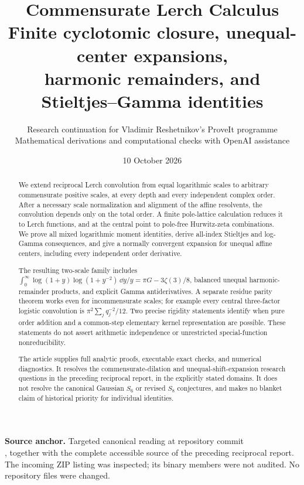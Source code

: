 \documentclass[11pt,a4paper]{article}
\title{\textbf{Commensurate Lerch Calculus}\\[6pt]
\large Finite cyclotomic closure, unequal-center expansions,\\
harmonic remainders, and Stieltjes--Gamma identities}
\author{Research continuation for Vladimir Reshetnikov's ProveIt programme\\
\small Mathematical derivations and computational checks with OpenAI assistance}
\date{10 October 2026}
\begin{document}
\maketitle
\begin{abstract}
We extend reciprocal Lerch convolution from equal logarithmic scales to
arbitrary commensurate positive scales, at every depth and every independent
complex order. After a necessary scale normalization and alignment of the
affine resolvents, the convolution depends only on the total order. A finite
pole-lattice calculation reduces it to Lerch functions, and at the central
point to pole-free Hurwitz-zeta combinations. We prove all mixed logarithmic
moment identities, derive all-index Stieltjes and log-Gamma consequences,
and give a normally convergent expansion for unequal affine centers,
including every independent order derivative.

The resulting two-scale family includes
$\int_0^\infty\log(1+y)\log(1+y^{-2})\,\dd y/y
=\pi G-3\zeta(3)/8$, balanced unequal harmonic-remainder products, and
explicit Gamma antiderivatives. A separate residue parity theorem works even
for incommensurate scales; for example every central three-factor logistic
convolution is $\pi^2\sum_jq_j^{-2}/12$. Two precise rigidity statements
identify when pure order addition and a common-step elementary kernel
representation are possible. These statements do not assert arithmetic
independence or unrestricted special-function nonreducibility.

The article supplies full analytic proofs, executable exact checks, and
numerical diagnostics. It resolves the commensurate-dilation and
unequal-shift-expansion research questions in the preceding reciprocal
report, in the explicitly stated domains. It does not resolve the canonical
Gaussian $S_6$ or revised $S_8$ conjectures, and makes no blanket claim of
historical priority for individual identities.
\end{abstract}
\vfill
\noindent\small\textbf{Source anchor.} Targeted canonical reading at repository commit\\
, together with the complete
accessible source of the preceding reciprocal report. The incoming ZIP
listing was inspected; its binary members were not audited. No repository
files were changed.\normalsize
\clearpage
\begingroup\small\tableofcontents\endgroup
\clearpage















\end{document}
